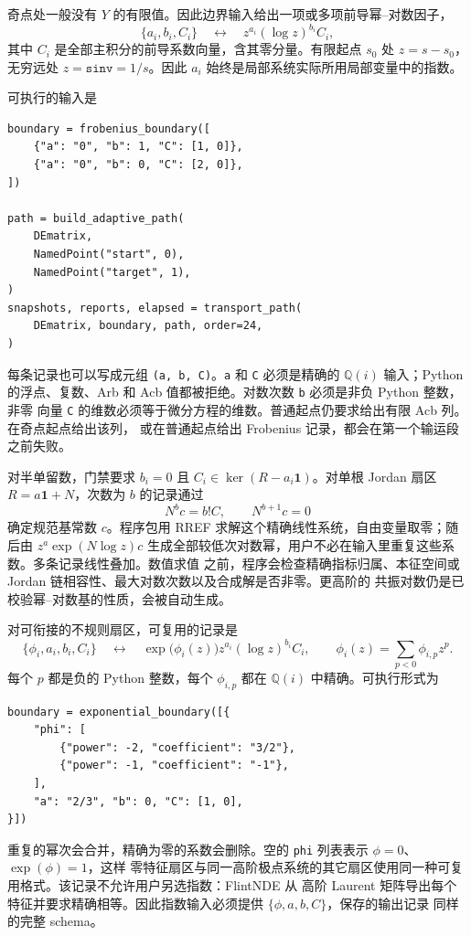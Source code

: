 \documentclass[11pt,a4paper]{ctexart}
\newcommand{\Id}{\mathbf 1}
\renewcommand{\_}{\origunderscore\allowbreak}
\begin{document}
奇点处一般没有 $Y$ 的有限值。因此边界输入给出一项或多项前导幂--对数因子，
\begin{equation}
  \bigl\{a_i,b_i,C_i\bigr\}
  \quad\longleftrightarrow\quad
  z^{a_i}(\log z)^{b_i}C_i,
  \label{eq:frobenius-boundary-record}
\end{equation}
其中 $C_i$ 是全部主积分的前导系数向量，含其零分量。有限起点 $s_0$ 处 $z=s-s_0$，无穷远处
$z=\texttt{sinv}=1/s$。因此 $a_i$ 始终是局部系统实际所用局部变量中的指数。

可执行的输入是
\begin{verbatim}
boundary = frobenius_boundary([
    {"a": "0", "b": 1, "C": [1, 0]},
    {"a": "0", "b": 0, "C": [2, 0]},
])

path = build_adaptive_path(
    DEmatrix,
    NamedPoint("start", 0),
    NamedPoint("target", 1),
)
snapshots, reports, elapsed = transport_path(
    DEmatrix, boundary, path, order=24,
)
\end{verbatim}
每条记录也可以写成元组 \texttt{(a, b, C)}。\texttt{a} 和 \texttt{C} 必须是精确的 $\mathbb Q(i)$
输入；Python 的浮点、复数、Arb 和 Acb 值都被拒绝。对数次数 \texttt{b} 必须是非负 Python 整数，非零
向量 \texttt{C} 的维数必须等于微分方程的维数。普通起点仍要求给出有限 Acb 列。在奇点起点给出该列，
或在普通起点给出 Frobenius 记录，都会在第一个输运段之前失败。

对半单留数，门禁要求 $b_i=0$ 且 $C_i\in\ker(R-a_i\Id)$。对单根 Jordan 扇区
$R=a\Id+N$，次数为 $b$ 的记录通过
\begin{equation}
  N^b c=b!C,
  \qquad N^{b+1}c=0
  \label{eq:frobenius-boundary-jordan-recovery}
\end{equation}
确定规范基常数 $c$。程序包用 RREF 求解这个精确线性系统，自由变量取零；随后由
$z^a\exp(N\log z)c$ 生成全部较低次对数幂，用户不必在输入里重复这些系数。多条记录线性叠加。数值求值
之前，程序会检查精确指标归属、本征空间或 Jordan 链相容性、最大对数次数以及合成解是否非零。更高阶的
共振对数仍是已校验幂--对数基的性质，会被自动生成。

对可衔接的不规则扇区，可复用的记录是
\begin{equation}
  \bigl\{\phi_i,a_i,b_i,C_i\bigr\}
  \quad\longleftrightarrow\quad
  \exp\!\bigl(\phi_i(z)\bigr)z^{a_i}(\log z)^{b_i}C_i,
  \qquad
  \phi_i(z)=\sum_{p<0}\phi_{i,p}z^p .
  \label{eq:exponential-boundary-record}
\end{equation}
每个 $p$ 都是负的 Python 整数，每个 $\phi_{i,p}$ 都在 $\mathbb Q(i)$ 中精确。可执行形式为
\begin{verbatim}
boundary = exponential_boundary([{
    "phi": [
        {"power": -2, "coefficient": "3/2"},
        {"power": -1, "coefficient": "-1"},
    ],
    "a": "2/3", "b": 0, "C": [1, 0],
}])
\end{verbatim}
重复的幂次会合并，精确为零的系数会删除。空的 \texttt{phi} 列表表示 $\phi=0$、$\exp(\phi)=1$，这样
零特征扇区与同一高阶极点系统的其它扇区使用同一种可复用格式。该记录不允许用户另选指数：FlintNDE 从
高阶 Laurent 矩阵导出每个特征并要求精确相等。因此指数输入必须提供 $\{\phi,a,b,C\}$，保存的输出记录
同样的完整 schema。
\end{document}

